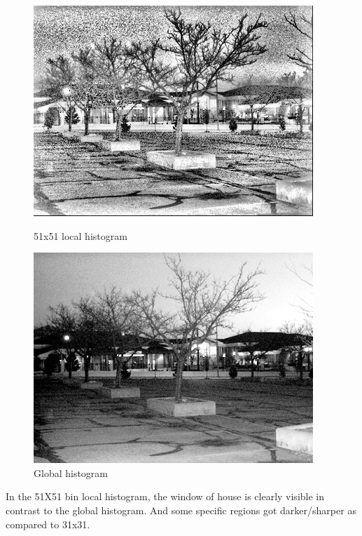\documentclass{article}
\begin{document}
\begin{figure}[!htb]
    \centering
    \begin{minipage}[b]{0.45\textwidth}
        \includegraphics[width=\textwidth]{LC1_local_51.jpg}
        \caption{51x51 local histogram}
    \end{minipage}
    \begin{minipage}[b]{0.45\textwidth}
        \includegraphics[width=\textwidth]{LC1_global.png}
        \caption{Global histogram}
    \end{minipage}
\end{figure}

In the 51X51 bin local histogram, the window of house is clearly visible in contrast to the global histogram. And some specific regions got darker/sharper as compared to 31x31.
\end{document}
